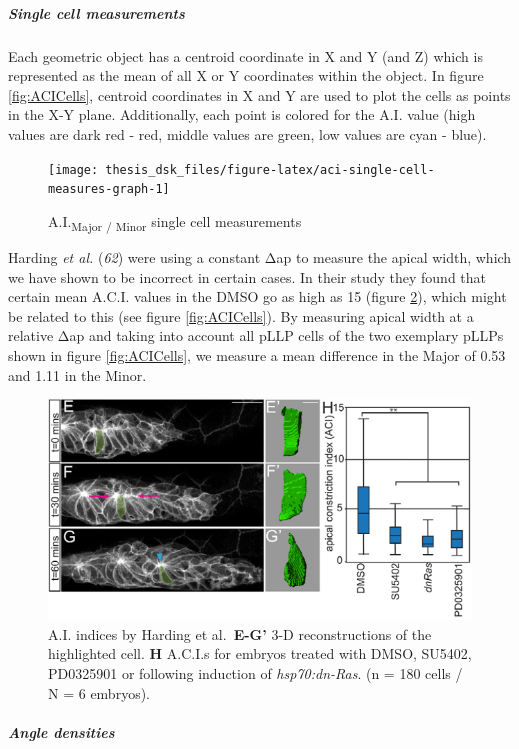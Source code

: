 \documentclass[10pt, b5paper, singlespacinge, twoside]{reedthesis} %
\theoremstyle{definition}
\theoremstyle{definition}
\theoremstyle{definition}
\theoremstyle{remark}
\begin{document}
\hypertarget{ACI-singlecell}{%
\subparagraph{Single cell measurements}\label{ACI-singlecell}}

Each geometric object has a centroid coordinate in X and Y (and Z) which is represented as the mean of all X or Y coordinates within the object. In figure \ref{fig:ACICells}, centroid coordinates in X and Y are used to plot the cells as points in the X-Y plane. Additionally, each point is colored for the A.I. value (high values are dark red - red, middle values are green, low values are cyan - blue).


\begin{figure}[H]

{\centering \texttt{[image: thesis\_dsk\_files/figure-latex/aci-single-cell-measures-graph-1]} 

}

\caption{A.I.\textsubscript{Major / Minor} single cell measurements}\label{fig:aci-single-cell-measures-graph}
\end{figure}
Harding \emph{et al.} (\emph{62}) were using a constant \(\mathrm{\Delta}\)ap to measure the apical width, which we have shown to be incorrect in certain cases. In their study they found that certain mean A.C.I. values in the DMSO go as high as 15 (figure \ref{fig:HardingACI}), which might be related to this (see figure \ref{fig:ACICells}). By measuring apical width at a relative \(\mathrm{\Delta}\)ap and taking into account all pLLP cells of the two exemplary pLLPs shown in figure \ref{fig:ACICells}, we measure a mean difference in the Major of 0.53 and 1.11 in the Minor.


\begin{figure}[H]

{\centering \includegraphics[width=0.6\linewidth]{figures/materials/models/harding} 

}

\caption[A.I. indices by Harding et al.]{A.I. indices by Harding et al.~\textbf{E-G'} 3-D reconstructions of the highlighted cell. \textbf{H} A.C.I.s for embryos treated with DMSO, SU5402, PD0325901 or following induction of \emph{hsp70:dn-Ras}. (n = 180 cells / N = 6 embryos).}\label{fig:HardingACI}
\end{figure}
\hypertarget{ACI-Angledens}{%
\subparagraph{Angle densities}\label{ACI-Angledens}}
\end{document}
